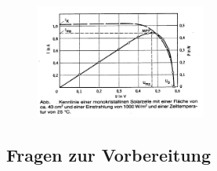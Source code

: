 \begin{figure}[h]
	\centering
		\includegraphics[width=0.5\textwidth]{Abbildungen/Leistung.jpg}
	\label{fig:Leistung}
\end{figure}

\begin{tutorhint}
\section{Fragen zur Vorbereitung}


\end{tutorhint}
